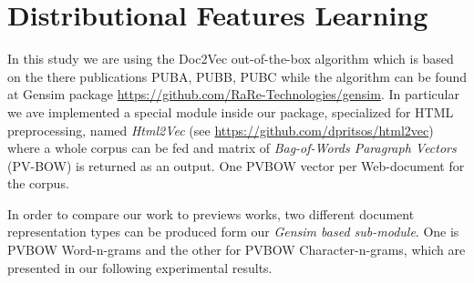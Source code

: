 \documentclass[runningheads]{llncs}
\begin{document}
%

\section{Distributional Features Learning}\label{sec:Gensim}

In this study we are using the Doc2Vec out-of-the-box algorithm which is based on the there publications PUBA, PUBB, PUBC while the algorithm can be found at Gensim package \url{https://github.com/RaRe-Technologies/gensim}. In particular we ave implemented a special module inside our package, specialized for HTML preprocessing, named \textit{Html2Vec} (see \url{https://github.com/dpritsos/html2vec}) where a whole corpus can be fed and matrix of \textit{Bag-of-Words Paragraph Vectors} (PV-BOW) is returned as an output. One PVBOW vector per Web-document for the corpus.

In order to compare our work to previews works, two different document representation types can be produced form our \textit{Gensim based sub-module}. One is PVBOW Word-n-grams and the other for PVBOW Character-n-grams, which are presented in our following experimental results.
\end{document}
